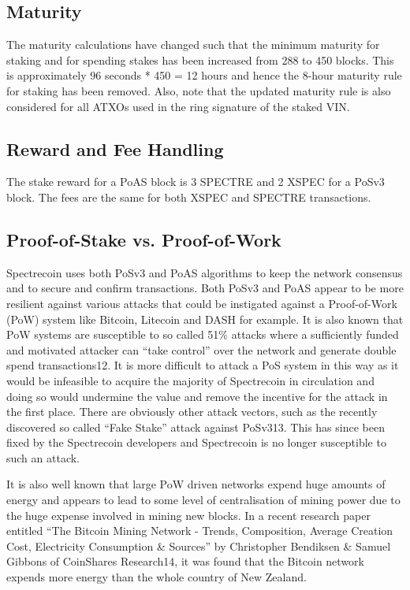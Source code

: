 \subsection{Maturity}
The maturity calculations have changed such that the minimum maturity for
staking and for spending stakes has been increased from 288 to 450 blocks.
This is approximately 96 seconds * 450 = 12 hours and hence the 8-hour
maturity rule for staking has been removed. Also, note that the updated
maturity rule is also considered for all ATXOs used in the ring signature
of the staked VIN.



\subsection{Reward and Fee Handling}
The stake reward for a PoAS block is 3 SPECTRE and 2 XSPEC for a PoSv3 block.
The fees are the same for both XSPEC and SPECTRE transactions.



\subsection{Proof-of-Stake vs. Proof-of-Work}
Spectrecoin uses both PoSv3 and PoAS algorithms to keep the network consensus
and to secure and confirm transactions. Both PoSv3 and PoAS appear to be more
resilient against various attacks that could be instigated against a
Proof-of-Work (PoW) system like Bitcoin, Litecoin and DASH for example.
It is also known that PoW systems are susceptible to so called 51\% attacks
where a sufficiently funded and motivated attacker can “take control” over
the network and generate double spend transactions12. It is more difficult
to attack a PoS system in this way as it would be infeasible to acquire the
majority of Spectrecoin in circulation and doing so would undermine the value
and remove the incentive for the attack in the first place. There are obviously
other attack vectors, such as the recently discovered so called “Fake Stake”
attack against PoSv313. This has since been fixed by the Spectrecoin developers
and Spectrecoin is no longer susceptible to such an attack.



It is also well known that large PoW driven networks expend huge amounts of
energy and appears to lead to some level of centralisation of mining power
due to the huge expense involved in mining new blocks. In a recent research
paper entitled “The Bitcoin Mining Network - Trends, Composition, Average
Creation Cost, Electricity Consumption \& Sources” by Christopher Bendiksen
\& Samuel Gibbons of CoinShares Research14, it was found that the Bitcoin
network expends more energy than the whole country of New Zealand.



